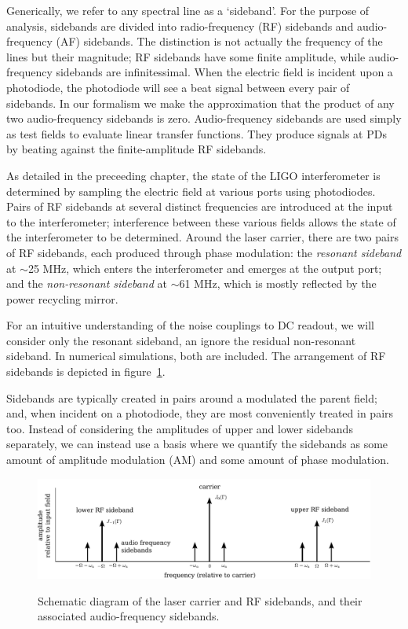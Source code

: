 Generically, we refer to any spectral line as a `sideband'. For the
purpose of analysis, 
sidebands are divided into radio-frequency (RF) sidebands and
audio-frequency (AF) sidebands. The distinction is not actually the
frequency of the lines but their magnitude; RF sidebands have some
finite amplitude, while audio-frequency sidebands are infinitessimal.
When the electric field is incident upon a photodiode, the photodiode
will see a beat signal between every pair of sidebands.  In our
formalism we make the approximation that the product of any two
audio-frequency sidebands is zero.  Audio-frequency sidebands are used
simply as test fields to evaluate linear transfer functions.  They
produce signals at PDs by beating against the finite-amplitude RF
sidebands.

As detailed in the preceeding chapter, the state of the LIGO interferometer is
determined by sampling the electric field at various ports using photodiodes.
Pairs of RF sidebands at several distinct frequencies are introduced at the
input to the interferometer; interference between these various fields allows
the state of the interferometer to be determined.  Around the laser carrier,
there are two pairs of RF sidebands, each produced through phase modulation: the
\emph{resonant sideband} at $\sim$25 MHz, which enters the interferometer and
emerges at the output port; and the \emph{non-resonant sideband} at $\sim$61
MHz, which is mostly reflected by the power recycling mirror.

For an intuitive understanding of the noise couplings to DC readout, we will
consider only the resonant sideband, an ignore the residual non-resonant
sideband.  In numerical simulations, both are included.  The arrangement of RF
sidebands is depicted in figure~\ref{fig:af-sidebands}.

Sidebands are typically created in pairs around a modulated the parent field;
and, when incident on a photodiode, they are most conveniently treated in pairs
too.  Instead of considering the amplitudes of upper and lower sidebands
separately, we can instead use a basis where we quantify the sidebands as some
amount of amplitude modulation (AM) and some amount of phase modulation.

\begin{figure}[]
\includegraphics[width=\columnwidth]{figures/af_sidebands.pdf}
\label{fig:af-sidebands}
\caption[Radio- and audio-frequency sidebands]{Schematic diagram of the laser carrier and RF sidebands, and their
  associated audio-frequency sidebands.}
\end{figure}

